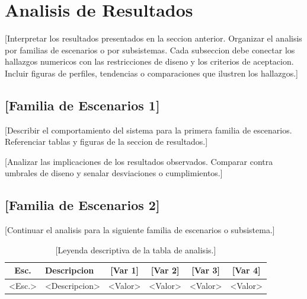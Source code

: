 \section{Analisis de Resultados}
\label{sec:analisis}

[Interpretar los resultados presentados en la seccion anterior. Organizar el analisis
por familias de escenarios o por subsistemas. Cada subseccion debe conectar los
hallazgos numericos con las restricciones de diseno y los criterios de aceptacion.
Incluir figuras de perfiles, tendencias o comparaciones que ilustren los hallazgos.]

\subsection{[Familia de Escenarios 1]}

[Describir el comportamiento del sistema para la primera familia de escenarios.
Referenciar tablas y figuras de la seccion de resultados.]


[Analizar las implicaciones de los resultados observados. Comparar contra umbrales
de diseno y senalar desviaciones o cumplimientos.]

\subsection{[Familia de Escenarios 2]}

[Continuar el analisis para la siguiente familia de escenarios o subsistema.]

\begin{table}[htbp]
    \centering
    \caption{[Leyenda descriptiva de la tabla de analisis.]}
    \label{tab:analisis}
    \begin{tabularx}{\textwidth}{@{}cXcccc@{}}
        \toprule
        \textbf{Esc.} & \textbf{Descripcion} & \textbf{[Var 1]} & \textbf{[Var 2]} & \textbf{[Var 3]} & \textbf{[Var 4]} \\
        \midrule
        <Esc.> & <Descripcion> & <Valor> & <Valor> & <Valor> & <Valor> \\
        \bottomrule
    \end{tabularx}
\end{table}

